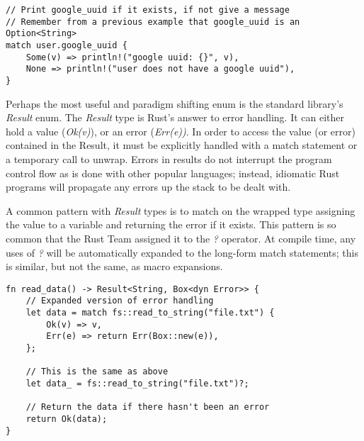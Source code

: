 \documentclass[12pt]{article}
\begin{document}
\begin{flushleft}
\singlespacing{}
\begin{verbatim}
// Print google_uuid if it exists, if not give a message
// Remember from a previous example that google_uuid is an Option<String>
match user.google_uuid {
    Some(v) => println!("google uuid: {}", v),
    None => println!("user does not have a google uuid"),
}
\end{verbatim}
\doublespacing{}

Perhaps the most useful and paradigm shifting enum is the standard library's
\textit{Result} enum. The \textit{Result} type is Rust's answer to error
handling. It can either hold a value (\textit{Ok(v)}), or an error
(\textit{Err(e))}. In order to access the value (or error) contained in the
Result, it must be explicitly handled with a match statement or a temporary call
to unwrap. Errors in results do not interrupt the program control flow as is
done with other popular languages; instead, idiomatic Rust programs will propagate
any errors up the stack to be dealt with.

A common pattern with \textit{Result} types is to match on the wrapped type
assigning the value to a variable and returning the error if it exists. This
pattern is so common that the Rust Team assigned it to the \textit{?} operator.
At compile time, any uses of \textit{?} will be automatically expanded to the
long-form match statements; this is similar, but not the same, as macro
expansions.

\singlespacing{}
\begin{verbatim}
fn read_data() -> Result<String, Box<dyn Error>> {
    // Expanded version of error handling
    let data = match fs::read_to_string("file.txt") {
        Ok(v) => v,
        Err(e) => return Err(Box::new(e)),
    };

    // This is the same as above
    let data_ = fs::read_to_string("file.txt")?;

    // Return the data if there hasn't been an error
    return Ok(data);
}
\end{verbatim}
\doublespacing{}


\cite{rustforrustaceans} \\
\cite{rust-lang.org} \\
\cite{rust-by-example} \\
\cite{the-c-programming-language} \\
\cite{noboilerplate}


 

\end{flushleft}
\end{document}
